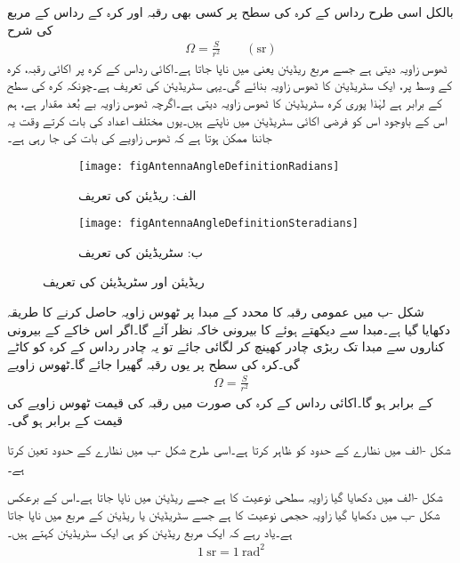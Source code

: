 بالکل اسی طرح  رداس  کے کرہ کی سطح پر کسی بھی رقبہ  اور کرہ کے رداس کے مربع  کی شرح
\begin{align}\label{مساوات_اینٹینا_ٹھوس_زاویہ_تعریف}
\Omega=\frac{S}{r^2} \quad \quad (\si{\steradian})
\end{align}
ٹھوس زاویہ  دیتی ہے جسے مربع ریڈیئن یعنی   میں ناپا جاتا ہے۔اکائی رداس کے کرہ پر اکائی رقبہ، کرہ کے وسط پر، ایک سٹریڈیئن  کا ٹھوس زاویہ بنائے گی۔یہی سٹریڈیئن کی تعریف ہے۔چونکہ کرہ کی سطح  کے برابر ہے لہٰذا پوری کرہ  سٹریڈیئن کا ٹھوس زاویہ دیتی ہے۔اگرچہ ٹھوس زاویہ بے بُعد مقدار ہے، ہم اس کے باوجود اس کو فرضی اکائی سٹریڈیئن میں ناپتے ہیں۔یوں مختلف اعداد کی بات کرتے وقت یہ جاننا ممکن ہوتا ہے کہ ٹھوس زاویے کی بات کی جا رہی ہے۔ 
\begin{figure}
\centering
\begin{subfigure}{0.5\textwidth}
\centering
\texttt{[image: figAntennaAngleDefinitionRadians]}
\caption*{الف: ریڈیئن کی تعریف}
\end{subfigure}%
%
\begin{subfigure}{0.5\textwidth}
\centering
\texttt{[image: figAntennaAngleDefinitionSteradians]}
\caption*{ب: سٹریڈیئن کی تعریف}
\end{subfigure}%
\caption{ریڈیئن اور سٹریڈیئن کی تعریف}
\label{شکل_اینٹینا_ریڈیئن_تعریف}
\end{figure}

شکل -ب میں عمومی رقبہ  کا محدد کے مبدا پر ٹھوس زاویہ حاصل کرنے کا طریقہ دکھایا گیا ہے۔مبدا سے دیکھتے ہوئے  کا بیرونی خاکہ نظر آئے گا۔اگر اس خاکے کے بیرونی کناروں سے  مبدا تک ربڑی چادر کھینچ کر لگائی جائے تو یہ چادر رداس  کے کرہ کو کاٹے گی۔کرہ کی سطح پر یوں رقبہ  گھیرا جائے گا۔ٹھوس زاویے
\begin{align}
\Omega=\frac{S}{r^2}
\end{align}
کے برابر ہو گا۔اکائی رداس کے کرہ کی صورت میں رقبہ  کی قیمت ٹھوس زاویے کی قیمت کے برابر ہو گی۔

شکل -الف میں   نظارے کے حدود کو ظاہر کرتا ہے۔اسی طرح شکل -ب میں  نظارے  کے حدود تعین کرتا ہے۔

شکل -الف  میں دکھایا گیا زاویہ سطحی نوعیت کا ہے جسے ریڈیئن میں ناپا جاتا ہے۔اس کے برعکس شکل -ب  میں دکھایا گیا زاویہ حجمی نوعیت کا ہے جسے سٹریڈیئن یا ریڈیئن کے مربع میں ناپا جاتا ہے۔یاد رہے کہ ایک مربع ریڈیئن کو ہی ایک سٹریڈیئن کہتے ہیں۔
\begin{align}
\SI{1}{\steradian}=\SI{1}{\radian \squared}
\end{align} 

